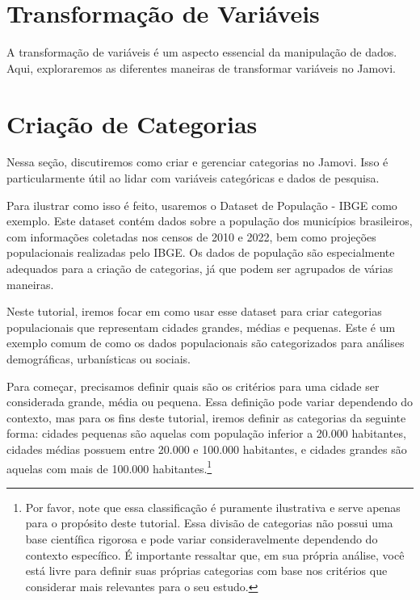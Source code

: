
\section{Transformação de Variáveis}
A transformação de variáveis é um aspecto essencial da manipulação de dados. Aqui, exploraremos as diferentes maneiras de transformar variáveis no Jamovi.

\section{Criação de Categorias}
Nessa seção, discutiremos como criar e gerenciar categorias no Jamovi. Isso é particularmente útil ao lidar com variáveis categóricas e dados de pesquisa.

Para ilustrar como isso é feito, usaremos o Dataset de População - IBGE como exemplo. Este dataset contém dados sobre a população dos municípios brasileiros, com informações coletadas nos censos de 2010 e 2022, bem como projeções populacionais realizadas pelo IBGE. Os dados de população são especialmente adequados para a criação de categorias, já que podem ser agrupados de várias maneiras.

Neste tutorial, iremos focar em como usar esse dataset para criar categorias populacionais que representam cidades grandes, médias e pequenas. Este é um exemplo comum de como os dados populacionais são categorizados para análises demográficas, urbanísticas ou sociais.

Para começar, precisamos definir quais são os critérios para uma cidade ser considerada grande, média ou pequena. Essa definição pode variar dependendo do contexto, mas para os fins deste tutorial, iremos definir as categorias da seguinte forma: cidades pequenas são aquelas com população inferior a 20.000 habitantes, cidades médias possuem entre 20.000 e 100.000 habitantes, e cidades grandes são aquelas com mais de 100.000 habitantes.\footnote{Por favor, note que essa classificação é puramente ilustrativa e serve apenas para o propósito deste tutorial. Essa divisão de categorias não possui uma base científica rigorosa e pode variar consideravelmente dependendo do contexto específico. É importante ressaltar que, em sua própria análise, você está livre para definir suas próprias categorias com base nos critérios que considerar mais relevantes para o seu estudo.}

